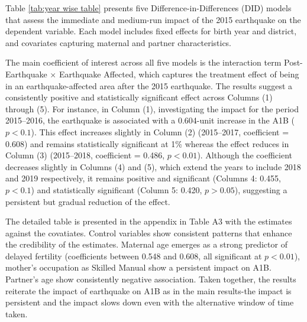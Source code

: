 \documentclass[11pt,a4paper]{article}
\begin{document}
\vspace{0.25 cm}

Table \ref{tab:year wise table} presents five Difference-in-Differences (DID) models that assess the immediate and medium-run impact of the 2015 earthquake on the dependent variable. Each model includes fixed effects for birth year and district, and covariates capturing maternal and partner characteristics.

\vspace{0.25 cm}



\vspace{0.25 cm}

The main coefficient of interest across all five models is the interaction term Post-Earthquake $\times$ Earthquake Affected, which captures the treatment effect of being in an earthquake-affected area after the 2015 earthquake. The results suggest a consistently positive and statistically significant effect across Columns (1) through (5). For instance, in Column (1), investigating the impact for the period 2015–2016, the earthquake is associated with a 0.604-unit increase in the A1B ($p < 0.1$). This effect increases slightly in Column (2) (2015–2017, coefficient = 0.608) and remains statistically significant at 1\% whereas the effect reduces in Column (3) (2015–2018, coefficient = 0.486, $p < 0.01$). Although the coefficient decreases slightly in Columns (4) and (5), which extend the years to include 2018 and 2019 respectively, it remains positive and significant (Columns 4: 0.455, $p < 0.1$) and statistically significant (Column 5: 0.420, $p > 0.05$), suggesting a persistent but gradual reduction of the effect.

\vspace{0.25cm}

The detailed table is presented in the appendix in Table A3 with the estimates against the covatiates. Control variables show consistent patterns that enhance the credibility of the estimates. Maternal age emerges as a strong predictor of delayed fertility (coefficients between 0.548 and 0.608, all significant at $p < 0.01$), mother's occupation as Skilled Manual show a persistent impact on A1B. Partner's age show consistently negative association. Taken together, the results reiterate the impact of earthquake on A1B as in the main results-the impact is persistent and the impact slows down even with the alternative window of time taken.

\vspace{0.25cm}
\end{document}
